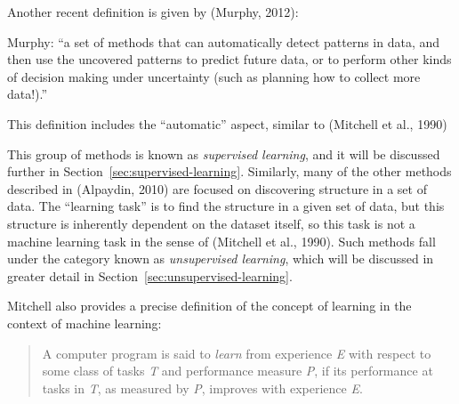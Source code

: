 Another recent definition is given by (Murphy, 2012):

Murphy: ``a set of methods that can automatically detect patterns in data, and then use the uncovered patterns to predict future data, or to perform other kinds of decision making under uncertainty (such as planning how to collect more data!).''

This definition includes the ``automatic'' aspect, similar to (Mitchell et al., 1990)

This group of methods is known as \emph{supervised learning}, and it will be discussed further in Section~\ref{sec:supervised-learning}. Similarly, many of the other methods described in (Alpaydin, 2010) are focused on discovering structure in a set of data. The ``learning task'' is to find the structure in a given set of data, but this structure is inherently dependent on the dataset itself, so this task is not a machine learning task in the sense of (Mitchell et al., 1990). Such methods fall under the category known as \emph{unsupervised learning}, which will be discussed in greater detail in Section~\ref{sec:unsupervised-learning}.

Mitchell also provides a precise definition of the concept of learning in the context of machine learning:
%
\begin{quote}
A computer program is said to \emph{learn} from experience \emph{E} with respect to some class of tasks \emph{T} and performance measure \emph{P}, if its performance at tasks in \emph{T}, as measured by \emph{P}, improves with experience \emph{E}.
\end{quote}
%
%
%


